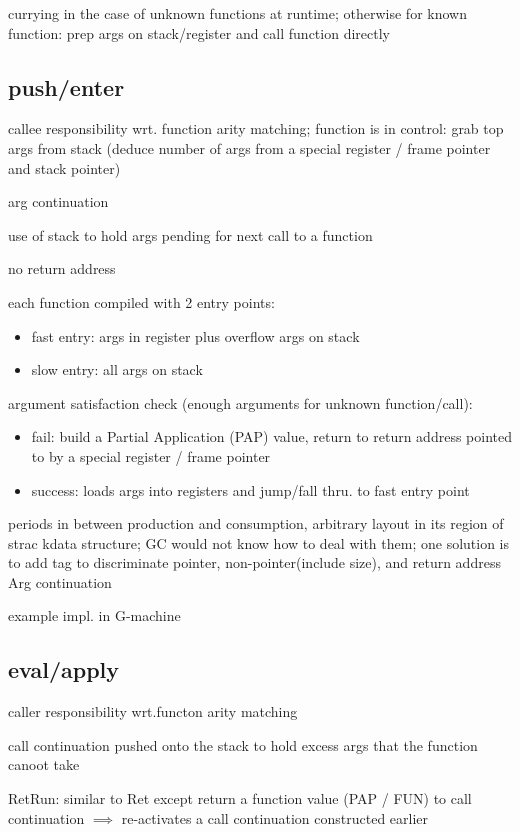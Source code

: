 \documentclass[8pt]{extarticle}
\begin{document}
\begin{multicols*}{2}
currying in the case of unknown functions at runtime; otherwise for known function: prep args on stack/register and call function directly

\subsection{push/enter}

callee responsibility wrt. function arity matching; function is in control: grab top args from stack (deduce number of args from a special register / frame pointer and stack pointer)

arg continuation

use of stack to hold args pending for next call to a function

no return address

each function compiled with 2 entry points:
\begin{itemize}
\item fast entry: args in register plus overflow args on stack
\item slow entry: all args on stack
\end{itemize}

argument satisfaction check (enough arguments for unknown function/call):
\begin{itemize}
\item fail: build a Partial Application (PAP) value, return to return address pointed to by a special register / frame pointer
\item success: loads args into registers and jump/fall thru. to fast entry point
\end{itemize}

periods in between production and consumption, arbitrary layout in its region of strac kdata structure; GC would not know how to deal with them; one solution is to add tag to discriminate pointer, non-pointer(include size), and return address Arg continuation

example impl. in G-machine

\subsection{eval/apply}

caller responsibility wrt.functon arity matching

call continuation pushed onto the stack to hold excess args that the function canoot take

RetRun: similar to Ret except return a function value (PAP / FUN) to call continuation $\implies$ re-activates a call continuation constructed earlier


\end{multicols*}
\end{document}
